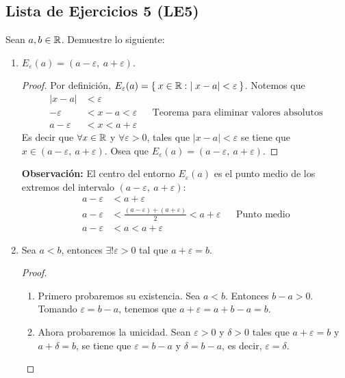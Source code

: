 \subsection*{Lista de Ejercicios 5 (LE5)}

Sean $a,b \in \mathbb{R}$. Demuestre lo siguiente:

\begin{enumerate}[label=\alph*)]
  
  \item $E_\varepsilon(a) = (a-\varepsilon, \ a+\varepsilon)$.
  
  \begin{proof}\leavevmode
    Por definición, $E_\varepsilon(a) = \Set{x\in \mathbb{R}: |x-a|<\varepsilon}$. Notemos que
    \begin{align*}
      |x - a | &< \varepsilon\\
      -\varepsilon &< x-a < \varepsilon && \text{Teorema para eliminar valores absolutos}\\
      a -\varepsilon &< x < a+ \varepsilon
    \end{align*}
    Es decir que $\forall x\in \mathbb{R}$ y $\forall \varepsilon>0$, tales que $|x-a|<\varepsilon$ se tiene que $x\in (a-\varepsilon, \ a+ \varepsilon)$. Osea que $E_\varepsilon(a) = (a-\varepsilon, \ a+\varepsilon)$.
  \end{proof}
  \textbf{Observación:} El centro del entorno $E_\varepsilon(a)$ es el punto medio de los extremos del intervalo $(a-\varepsilon, \ a+\varepsilon)$:
  \begin{align*}
    a - \varepsilon &< a + \varepsilon\\
    a- \varepsilon &< \frac{(a - \varepsilon)+(a + \varepsilon)}{2} < a + \varepsilon && \text{Punto medio}\\
    a- \varepsilon &< a < a + \varepsilon
  \end{align*}
  
  \item Sea $a<b$, entonces $\exists! \varepsilon>0$ tal que $a+\varepsilon=b$.
 \begin{proof}\leavevmode
  \begin{enumerate}[label=\roman*)]
    \item Primero probaremos su existencia. Sea $a<b$. Entonces $b-a>0$. Tomando $\varepsilon=b-a$, tenemos que $a+\varepsilon=a+b-a=b$.
    \item Ahora probaremos la unicidad. Sean $\varepsilon>0$ y $\delta>0$ tales que $a+\varepsilon=b$ y $a+\delta=b$, se tiene que $\varepsilon=b-a$ y $\delta=b-a$, es decir, $\varepsilon=\delta$. \qedhere
  \end{enumerate}
 \end{proof}
 

\end{enumerate}
